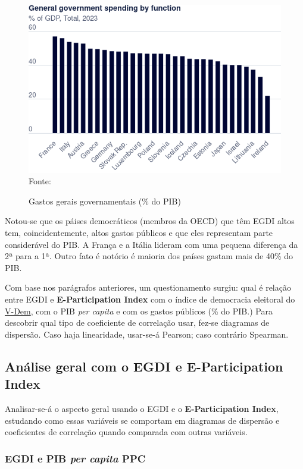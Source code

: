 \begin{figure}[H]
	\centering
	\caption{Gastos gerais governamentais (\% do PIB)}
	\includegraphics[width=1\linewidth]{figuras/government_spending/government-spending-by-function}
	\label{fig:government-spending-by-function}
	\footnotesize{Fonte: \cite{global_gov_spending_function}}
\end{figure}

Notou-se que os páises democráticos (membros da OECD) que têm EGDI altos tem, coincidentemente, altos gastos públicos e que eles representam parte considerável do PIB. A França e a Itália lideram com uma pequena diferença da 2ª para a 1ª. Outro fato é notório é maioria dos países gastam mais de 40\% do PIB.

Com base nos parágrafos anteriores, um questionamento surgiu: qual é relação entre EGDI e \textbf{E-Participation Index} com o índice de democracia eleitoral do \href{https://www.v-dem.net/}{V-Dem}, com o PIB \textit{per capita} e com os gastos públicos (\% do PIB.) Para descobrir qual tipo de coeficiente de correlação usar, fez-se diagramas de dispersão. Caso haja linearidade, usar-se-á Pearson; caso contrário Spearman.

\subsection{Análise geral com o EGDI e E-Participation Index}

Analisar-se-á o aspecto geral usando o EGDI e o \textbf{E-Participation Index}, estudando como essas variáveis se comportam em diagramas de dispersão e coeficientes de correlação quando comparada com outras variáveis.

\subsubsection{EGDI e PIB \textit{per capita} PPC}

